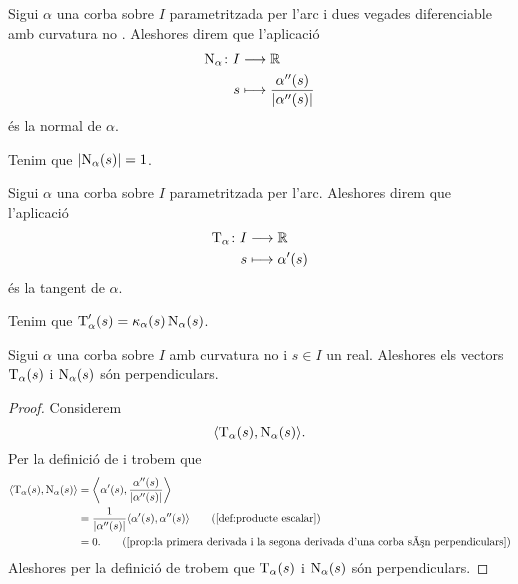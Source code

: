 \documentclass[../Apunts.tex]{subfiles}
\begin{document}
	\begin{definition}[Normal]
		\label{def:normal}
		Sigui \(\alpha\) una corba sobre \(I\) parametritzada per l'arc i dues vegades diferenciable amb curvatura no \nulla{}. Aleshores direm que l'aplicació
		\begin{align*}
			\normal_{\alpha}\colon I&\longrightarrow\mathbb{R} \\
			s&\longmapsto\frac{\alpha''(s)}{\norm{\alpha''(s)}}
		\end{align*}
		és la normal de \(\alpha\).
	\end{definition}
	\begin{observation}
		\label{obs:la normal a una corba és unitària}
		Tenim que \(\norm{\normal_{\alpha}(s)}=1\).
	\end{observation}
	\begin{definition}[Tangent]
		\label{def:tangent}
		Sigui \(\alpha\) una corba sobre \(I\) parametritzada per l'arc. Aleshores direm que l'aplicació
		\begin{align*}
			\operatorname{T}_{\alpha}\colon I&\longrightarrow\mathbb{R} \\
			s&\longmapsto\alpha'(s)
		\end{align*}
		és la tangent de \(\alpha\).
	\end{definition}
	\begin{observation}
		\label{obs:la derivada de la tangent és la curvatura per la normal}
		Tenim que \(\operatorname{T}_{\alpha}'(s)=\operatorname{\kappa}_{\alpha}(s)\operatorname{N}_{\alpha}(s)\).
	\end{observation}
	\begin{proposition}
		\label{prop:la tangent i la normal d'una corba amb curvatura no nula són perpendiculars}
		Sigui \(\alpha\) una corba sobre \(I\) amb curvatura no \nulla{} i \(s\in I\) un real. Aleshores els vectors \(\operatorname{T}_{\alpha}(s)\) i \(\operatorname{N}_{\alpha}(s)\) són perpendiculars.
	\end{proposition}
	\begin{proof}
		Considerem
		\[\prodesc{\tangent_{\alpha}(s)}{\normal_{\alpha}(s)}.\]
		Per la definició de  i  trobem que
		\begin{align*}
			\prodesc{\tangent_{\alpha}(s)}{\normal_{\alpha}(s)}&=\prodesc[\bigg]{\alpha'(s)}{\frac{\alpha''(s)}{\norm{\alpha''(s)}}} \\
			&=\frac{1}{\norm{\alpha''(s)}}\prodesc{\alpha'(s)}{\alpha''(s)} \tag{\ref{def:producte escalar}} \\
			&=0. \tag{\ref{prop:la primera derivada i la segona derivada d'una corba són perpendiculars}}
		\end{align*}
		Aleshores per la definició de  trobem que \(\operatorname{T}_{\alpha}(s)\) i \(\operatorname{N}_{\alpha}(s)\) són perpendiculars.
	\end{proof}
\end{document}
